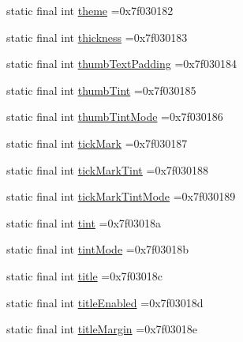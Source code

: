 \begin{DoxyCompactItemize}
\item 
static final int \mbox{\hyperlink{classcom_1_1example_1_1trainawearapplication_1_1_r_1_1attr_af0b5647a719d67e15e9a1c633c7d0cba}{theme}} =0x7f030182
\item 
static final int \mbox{\hyperlink{classcom_1_1example_1_1trainawearapplication_1_1_r_1_1attr_ad56b25180f0ea533d8881feb0c5045fc}{thickness}} =0x7f030183
\item 
static final int \mbox{\hyperlink{classcom_1_1example_1_1trainawearapplication_1_1_r_1_1attr_adf7b05515dfb5928d2f150075c9201b5}{thumb\+Text\+Padding}} =0x7f030184
\item 
static final int \mbox{\hyperlink{classcom_1_1example_1_1trainawearapplication_1_1_r_1_1attr_afc9b5cac7660ecd32144237abe4bc5a7}{thumb\+Tint}} =0x7f030185
\item 
static final int \mbox{\hyperlink{classcom_1_1example_1_1trainawearapplication_1_1_r_1_1attr_ad235baed018e1101b3c089a8332da90c}{thumb\+Tint\+Mode}} =0x7f030186
\item 
static final int \mbox{\hyperlink{classcom_1_1example_1_1trainawearapplication_1_1_r_1_1attr_a24c7c233c39f72ce303b082f35d66c89}{tick\+Mark}} =0x7f030187
\item 
static final int \mbox{\hyperlink{classcom_1_1example_1_1trainawearapplication_1_1_r_1_1attr_a91a05f3697af6e693ff8680b084b4ada}{tick\+Mark\+Tint}} =0x7f030188
\item 
static final int \mbox{\hyperlink{classcom_1_1example_1_1trainawearapplication_1_1_r_1_1attr_a92d10ebf841217cf1f1e18424edc5f8c}{tick\+Mark\+Tint\+Mode}} =0x7f030189
\item 
static final int \mbox{\hyperlink{classcom_1_1example_1_1trainawearapplication_1_1_r_1_1attr_a8191a7e1f1ac4a0a44c4ae643ff15521}{tint}} =0x7f03018a
\item 
static final int \mbox{\hyperlink{classcom_1_1example_1_1trainawearapplication_1_1_r_1_1attr_a3b4186ffc1d83d1e162896b35873a5ee}{tint\+Mode}} =0x7f03018b
\item 
static final int \mbox{\hyperlink{classcom_1_1example_1_1trainawearapplication_1_1_r_1_1attr_acf87c7372dec6d277cc72aa7d37515c8}{title}} =0x7f03018c
\item 
static final int \mbox{\hyperlink{classcom_1_1example_1_1trainawearapplication_1_1_r_1_1attr_aa71a8005aef3f335d3ba175b70a4bd50}{title\+Enabled}} =0x7f03018d
\item 
static final int \mbox{\hyperlink{classcom_1_1example_1_1trainawearapplication_1_1_r_1_1attr_a8bf14640d51c5af9fe22db8ed09e9d6b}{title\+Margin}} =0x7f03018e

\end{DoxyCompactItemize}
